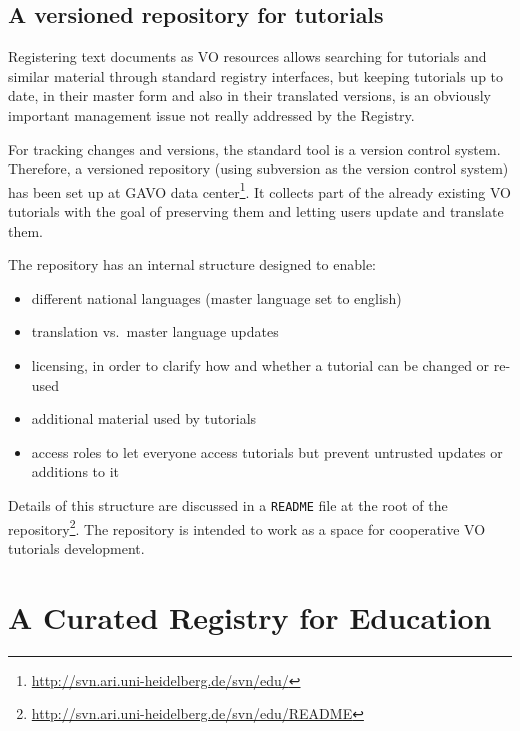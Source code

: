 \documentclass{ivoa}
\begin{document}
\subsection{A versioned repository for tutorials}

\label{sect:svn-repo}

Registering text documents as VO resources allows searching for tutorials
and similar 
material through standard registry interfaces, but keeping 
tutorials up to date, in their master form and also in their translated 
versions, is an obviously important management issue not really
addressed by the Registry.

For tracking changes and versions, the standard tool is a version
control system.  Therefore,
a versioned repository (using subversion as the version control system) 
has been set up at GAVO data
center\footnote{\url{http://svn.ari.uni-heidelberg.de/svn/edu/}}.
It collects part of the
already existing VO tutorials with the goal of preserving them and
letting users 
update and translate them.

The repository has an internal structure designed to enable:

\begin{itemize}

\item different national languages (master language set to english){}

\item translation vs.~master language updates{}

\item licensing, in order to clarify how and whether a tutorial can be changed or re-used{}

\item additional material used by tutorials

\item access roles to let everyone access tutorials but prevent untrusted updates or additions to it

\end{itemize}

Details of this structure are discussed in a \texttt{README} file at the
root of the
repository\footnote{\url{http://svn.ari.uni-heidelberg.de/svn/edu/README}}.
The repository is intended to work as a space for cooperative 
VO tutorials development.



\section{A Curated Registry for Education}
\end{document}
